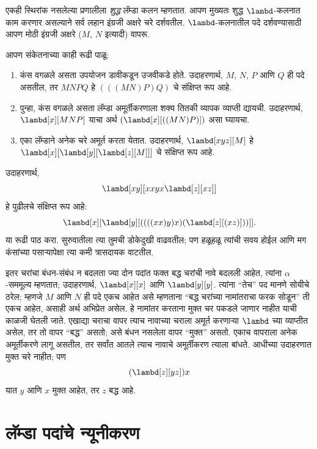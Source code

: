 एकही स्थिरांक नसलेल्या प्रणालीला \emph{शुद्ध} लॅम्डा कलन म्हणतात.
आपण मुख्यतः शुद्ध $\lambd$-कलनात काम करणार असल्याने सर्व लहान इंग्रजी
अक्षरे चरे दर्शवतील. $\lambd$-कलनातील पदे दर्शवण्यासाठी आपण मोठी
इंग्रजी अक्षरे ($M$, $N$ इत्यादी) वापरू.

आपण संकेतनाच्या काही रूढी पाळू:

\begin{conv}
\begin{enumerate}
\item कंस वगळले असता उपयोजन डावीकडून उजवीकडे होते. उदाहरणार्थ,
  $M$, $N$, $P$ आणि $Q$ ही पदे असतील, तर $MNPQ$ हे
  $(((MN)P)Q)$ चे संक्षिप्त रूप आहे.
\item पुन्हा, कंस वगळले असता लॅम्डा अमूर्तीकरणाला शक्य तितकी
  व्यापक व्याप्ती द्यायची. उदाहरणार्थ, $\lambd[x][MNP]$ याचा
  अर्थ $(\lambd[x][((MN)P)])$ असा घ्यायचा.
\item एका लॅम्डाने अनेक चरे अमूर्त करता येतात. उदाहरणार्थ,
  $\lambd[xyz][M]$ हे
  $\lambd[x][\lambd[y][\lambd[z][M]]]$ चे संक्षिप्त रूप आहे.
\end{enumerate}
\end{conv}

उदाहरणार्थ,
\[\lambd[xy][xxyx \lambd[z][xz]]
\]
हे पुढीलचे संक्षिप्त रूप आहे:
\[\lambd[x][\lambd[y][((((xx)y)x)(\lambd[z][(xz)]))]].
\]
या रूढी पाठ करा. सुरुवातीला त्या तुमची डोकेदुखी वाढवतील;
पण हळूहळू त्यांची सवय होईल आणि मग कंसांच्या पसाऱ्यापेक्षा
त्या कमी त्रासदायक वाटतील.


इतर चरांचा बंधन-संबंध न बदलता ज्या दोन पदांत फक्त
बद्ध चरांची नावे बदलली आहेत, त्यांना
$\alpha$-सममूल्य म्हणतात; उदाहरणार्थ, $\lambd[x][x]$ आणि
$\lambd[y][y]$. त्यांना “तेच” पद मानणे सोयीचे ठरेल; म्हणजे
$M$ आणि $N$ ही पदे एकच आहेत असे म्हणताना “बद्ध चरांच्या
नामांतराचा फरक सोडून” ती एकच आहेत, असाही अर्थ अभिप्रेत असेल.
हे नामांतर करताना मुक्त चर पकडले जाणार नाहीत याची काळजी घेतली जाते.
एखाद्या चराचा वापर त्याच नावाच्या चराला अमूर्त करणाऱ्या
$\lambd$ च्या व्याप्तीत असेल, तर तो वापर “बद्ध” असतो;
असे बंधन नसलेला वापर “मुक्त” असतो. एकाच वापराला अनेक
अमूर्तीकरणे लागू असतील, तर सर्वांत आतले त्याच नावाचे अमूर्तीकरण
त्याला बांधते. आधीच्या उदाहरणात मुक्त चरे नाहीत; पण
\[(\lambd[z][yz])x
\]
यात $y$ आणि $x$ मुक्त आहेत, तर $z$ बद्ध आहे.











\section{लॅम्डा पदांचे न्यूनीकरण}\label{lam:int:red:sec}


